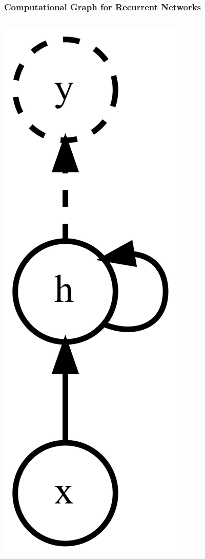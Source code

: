 \documentclass{beamer}
\begin{document}
\begin{frame}
  \frametitle{Computational Graph for Recurrent Networks}
  \begin{columns}
    \begin{column}{0.3\textwidth}
      \begin{center}
        \includegraphics[height=0.6\textheight]{../img/recurrent-nn.png}

\end{center}
\end{column}
\end{columns}
\end{frame}
\end{document}
